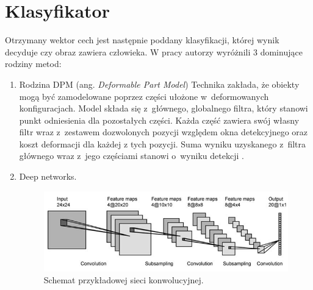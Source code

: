 \section{Klasyfikator}

Otrzymany wektor cech jest następnie poddany klasyfikacji, której wynik decyduje czy obraz zawiera człowieka.
W pracy \cite{benenson2014ten} autorzy wyróżnili 3 dominujące rodziny metod:

\begin{enumerate}
\item Rodzina DPM (ang. \textit{Deformable Part Model})
%
Technika zakłada, że obiekty mogą być zamodelowane poprzez części ułożone w~deformowanych konfiguracjach. 
Model składa się z~głównego, globalnego filtra, który stanowi punkt odniesienia dla pozostałych części. 
Każda część zawiera swój własny filtr wraz z~zestawem dozwolonych pozycji względem okna detekcyjnego oraz koszt deformacji dla każdej z tych pozycji. 
Suma wyniku uzyskanego z~filtra głównego wraz z~jego częściami stanowi o~wyniku detekcji \cite{felzenszwalb2008discriminatively}.

\item Deep networks.

\begin{figure}
\centering
\includegraphics[width=0.8\linewidth]{images/DNN}
\caption[IntegralImage.]{Schemat przykładowej sieci konwolucyjnej.}
\label{fig:DNN}
\end{figure}


\end{enumerate}
